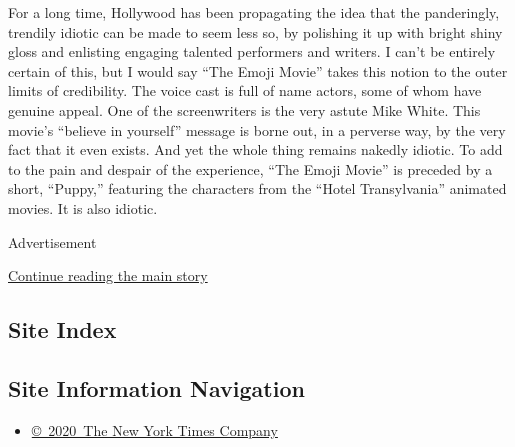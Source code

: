 For a long time, Hollywood has been propagating the idea that the
panderingly, trendily idiotic can be made to seem less so, by polishing
it up with bright shiny gloss and enlisting engaging talented performers
and writers. I can't be entirely certain of this, but I would say ``The
Emoji Movie'' takes this notion to the outer limits of credibility. The
voice cast is full of name actors, some of whom have genuine appeal. One
of the screenwriters is the very astute Mike White. This movie's
``believe in yourself'' message is borne out, in a perverse way, by the
very fact that it even exists. And yet the whole thing remains nakedly
idiotic. To add to the pain and despair of the experience, ``The Emoji
Movie'' is preceded by a short, ``Puppy,'' featuring the characters from
the ``Hotel Transylvania'' animated movies. It is also idiotic.

Advertisement

\protect\hyperlink{after-bottom}{Continue reading the main story}

\hypertarget{site-index}{%
\subsection{Site Index}\label{site-index}}

\hypertarget{site-information-navigation}{%
\subsection{Site Information
Navigation}\label{site-information-navigation}}

\begin{itemize}
\tightlist
\item
  \href{https://help.nytimes3xbfgragh.onion/hc/en-us/articles/115014792127-Copyright-notice}{©~2020~The
  New York Times Company}
\end{itemize}

